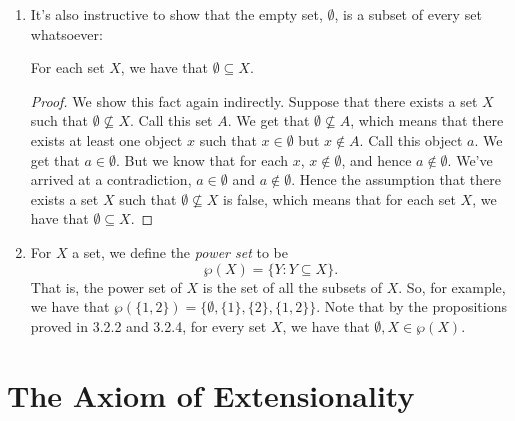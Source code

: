\begin{enumerate}[{\thesection}.1]
\item It's also instructive to show that the empty set, $\emptyset$, is a subset of every set whatsoever:
\begin{proposition}\label{proposition:1.empty}
For each set $X$, we have that $\emptyset\subseteq X$.
\end{proposition}
\begin{proof}
We show this fact again indirectly. Suppose that there exists a set $X$ such that $\emptyset\nsubseteq X$. Call this set $A$. We get that $\emptyset\nsubseteq A$, which means that there exists at least one object $x$ such that $x\in \emptyset$ but $x\notin A$. Call this object $a$. We get that $a\in \emptyset$. But we know that for each $x$, $x\notin \emptyset$, and hence $a\notin \emptyset$. We've arrived at a contradiction, $a\in \emptyset$ and $a\notin\emptyset$. Hence the assumption that there exists a set $X$ such that $\emptyset\nsubseteq X$ is false, which means that for each set $X$, we have that $\emptyset\subseteq X$.
\end{proof}

\item For $X$ a set, we define the \emph{power set} to be \[\wp(X)=\{Y: Y\subseteq X\}.\] That is, the power set of $X$ is the set of all the subsets of $X$. So, for example, we have that $\wp(\{1,2\})=\{\emptyset, \{1\}, \{2\}, \{1,2\}\}$. Note that by the propositions proved in 3.2.2 and 3.2.4, for every set $X$, we have that $\emptyset, X\in \wp(X)$.

\end{enumerate}

\section{The Axiom of Extensionality}

